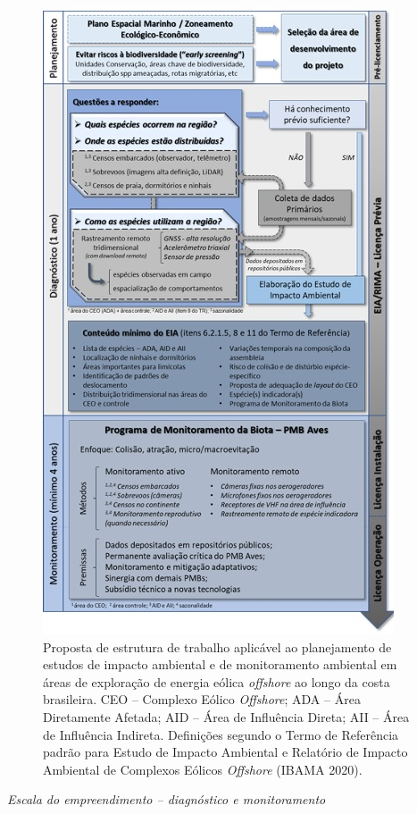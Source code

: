 \documentclass[
  oneside]{scrbook}
\begin{document}
\begin{figure}[H]

{\centering \includegraphics[width=0.65\linewidth]{imagens/cap08/Figura_8.6} 

}

\caption{Proposta de estrutura de trabalho aplicável ao planejamento de estudos de impacto ambiental e de monitoramento ambiental em áreas de exploração de energia eólica \emph{offshore} ao longo da costa brasileira. CEO -- Complexo Eólico \emph{Offshore}; ADA -- Área Diretamente Afetada; AID -- Área de Influência Direta; AII -- Área de Influência Indireta. Definições segundo o Termo de Referência padrão para Estudo de Impacto Ambiental e Relatório de Impacto Ambiental de Complexos Eólicos \emph{Offshore} (IBAMA 2020).}\label{fig:66}
\end{figure}



\emph{Escala do empreendimento -- diagnóstico e monitoramento}
\end{document}
